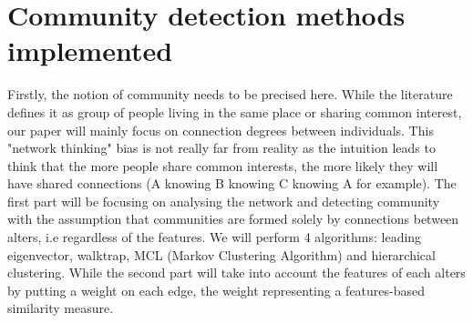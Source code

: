 \documentclass[11pt]{article}       %
\begin{document}
\newpage

\section{Community detection methods implemented} \label{communitydetection}

Firstly, the notion of community needs to be precised here. While the literature defines it as group of people living in the same place or sharing common interest, our paper will mainly focus on connection degrees between individuals. This "network thinking" bias is not really far from reality as the intuition leads to think that the more people share common interests, the more likely they will have shared connections (A knowing B  knowing C knowing A for example). 
The first part will be focusing on analysing the network and detecting community with the assumption that communities are formed solely by connections between alters, i.e regardless of the features. We will perform 4 algorithms: leading eigenvector, walktrap, MCL (Markov Clustering Algorithm) and hierarchical clustering. While the second part will take into account the features of each alters by putting a weight on each edge, the weight representing a features-based similarity measure.
\end{document}
